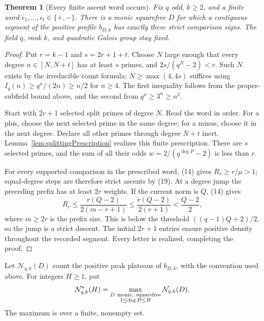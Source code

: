 \documentclass[11pt]{article}
\newtheorem{theorem}{Theorem}[section]
\begin{document}
\begin{theorem}[Every finite ascent word occurs]\label{thm:quadraticWords}
Fix \(q\) odd, \(k\geq2\), and a finite word
\(\epsilon_1,\ldots,\epsilon_t\in\{+,-\}\).
There is a monic squarefree \(D\) for which a contiguous segment of the
positive profile \(b_{D,k}\) has exactly these strict comparison signs.
The field \(q\), rank \(k\), and quadratic Galois group stay fixed.
\end{theorem}
\begin{proof}
Put \(r=k-1\) and \(s=2r+1+t\). Choose \(N\) large enough that every
degree \(n\in[N,N+t]\) has at least \(s\) primes, and
\(2s/(q^N-2)<r\). Such \(N\) exists by the irreducible count formula;
\(N\geq\max(4,4s)\) suffices using
\(I_q(n)\geq q^n/(2n)\geq n/2\) for \(n\geq4\).
The first inequality follows from the proper-subfield bound above,
and the second from \(q^n\geq3^n\geq n^2\).

Start with \(2r+1\) selected split primes of degree \(N\).
Read the word in order. For a plus, choose the next selected prime
in the same degree; for a minus, choose it in the next degree.
Declare all other primes through degree \(N+t\) inert.
Lemma~\ref{lem:splittingPrescription} realizes this finite prescription.
There are \(s\) selected primes, and the sum of all their odds
\(w=2/(q^{\deg P}-2)\) is less than \(r\).

For every supported comparison in the prescribed word,
(14) gives \(R_r\geq r/\mu>1\); equal-degree steps are therefore
strict ascents by (19). At a degree jump the preceding prefix has
at least \(2r\) weights. If the current norm is \(Q\), (14) gives
\[
 R_r\leq\frac{r(Q-2)}{2(m-r+1)}
       \leq\frac{r(Q-2)}{2(r+1)}
       <\frac{Q-2}{2},
\]
where \(m\geq2r\) is the prefix size. This is below the threshold
\(((q-1)Q+2)/2\), so the jump is a strict descent.
The initial \(2r+1\) entries ensure positive density throughout the
recorded segment. Every letter is realized, completing the proof.
\end{proof}

Let \(\mathcal N_{q,k}(D)\) count the positive peak plateaus of
\(b_{D,k}\), with the convention used above. For integers \(H\geq1\),
put
\[
 \mathcal N_{q,k}^{*}(H)=
 \max_{\substack{D\ {\rm monic,\ squarefree}\\1\leq\deg D\leq H}}
                    \mathcal N_{q,k}(D).
\]
The maximum is over a finite, nonempty set.
\end{document}
